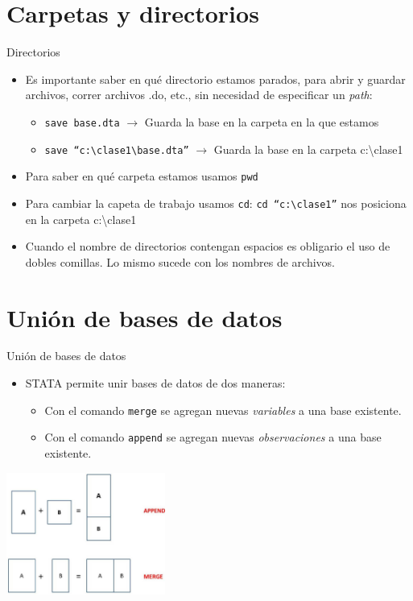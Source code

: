 \documentclass{beamer}
\begin{document}
\section{Carpetas y directorios}

\begin{frame}{Directorios}
\begin{itemize}
\item Es importante saber en qué directorio estamos parados, para abrir y guardar archivos, correr archivos .do, etc., sin necesidad de especificar un \textit{path}:
\begin{itemize}
\item \texttt{save base.dta}  \hspace{0.3 cm} $\rightarrow$ Guarda la base en la carpeta en la que estamos
\item \texttt{save ``c:\textbackslash clase1\textbackslash base.dta''}  \hspace{0.3 cm} $\rightarrow$ Guarda la base en la carpeta c:\textbackslash clase1 
\end{itemize}
\item Para saber en qué carpeta estamos usamos \texttt{pwd}
\item Para cambiar la capeta de trabajo usamos \texttt{cd}: \texttt{cd ``c:\textbackslash clase1''} nos posiciona en la carpeta c:\textbackslash clase1 
\item Cuando el nombre de directorios contengan espacios es obligario el uso de dobles comillas. Lo mismo sucede con los nombres de archivos.
\end{itemize}
\end{frame}

\section{Unión de bases de datos}

\begin{frame}{Unión de bases de datos}
\begin{itemize}
\item STATA permite unir bases de datos de dos maneras:
\begin{itemize}
\item Con el comando \texttt{merge} se agregan nuevas \textit{variables} a una base existente.
\item Con el comando \texttt{append} se agregan nuevas \textit{observaciones} a una base existente.
\end{itemize}
\end{itemize}
\centerline{\includegraphics[height=4cm]{union.jpg}}
\end{frame}
\end{document}
